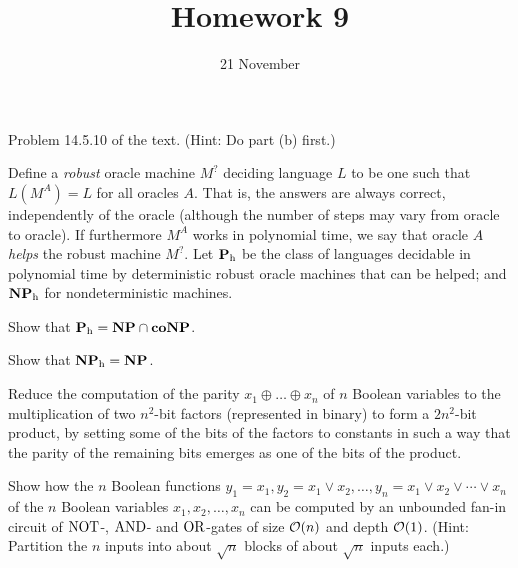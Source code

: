 \documentclass{../math167}
\title{Homework 9}
\author{}
\date{21 November}
\begin{document}
\begin{problems}
\item Problem 14.5.10 of the text.  (Hint: Do part (b) first.)

  \newcommand{\h}{_\mathrm h}

  \begin{book}

    Define a \emph{robust} oracle machine \(M^?\) deciding language
    \(L\) to be one such that \(L(M^A) = L\) for all oracles \(A\).
    That is, the answers are always correct, independently of the
    oracle (although the number of steps may vary from oracle to
    oracle).  If furthermore \(M^A\) works in polynomial time, we say
    that oracle \(A\) \emph{helps} the robust machine \(M^?\).  Let
    \(\P\h\) be the class of languages decidable in polynomial time by
    deterministic robust oracle machines that can be helped; and
    \(\NP\h\) for nondeterministic machines.
    \begin{problems}
    \item Show that \(\P\h = \NP \cap \co\NP\).
    \item Show that \(\NP\h = \NP\).
    \end{problems}
  \end{book}

  \begin{solution}
    \begin{problems}
    \item
    \item
    \end{problems}
  \end{solution}

\item Reduce the computation of the parity
  \(x_1 \oplus \dots \oplus x_n\) of \(n\) Boolean variables to the
  multiplication of two \(n^2\)-bit factors (represented in binary) to
  form a \(2n^2\)-bit product, by setting some of the bits of the
  factors to constants in such a way that the parity of the remaining
  bits emerges as one of the bits of the product.

  \begin{solution}
  \end{solution}

\item Show how the \(n\) Boolean functions
  \(y_1=x_1, y_2 = x_1 \lor x_2, \dots, y_n = x_1 \lor x_2 \lor \cdots
  \lor x_n\) of the \(n\) Boolean variables \(x_1, x_2, \dots, x_n\)
  can be computed by an unbounded fan-in circuit of \(\operatorname{NOT}\)-,
  \(\operatorname{AND}\)- and \(\operatorname{OR}\)-gates of size \(\mathcal O(n)\) and depth
  \(\mathcal O(1)\). (Hint: Partition the \(n\) inputs into about \(\sqrt n\)
  blocks of about \(\sqrt n\) inputs each.)

  \begin{solution}
  \end{solution}

\end{problems}
\end{document}

